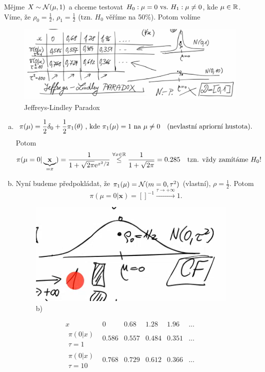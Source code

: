 \begin{example}
	Mějme $X\sim\mathcal{N}(\mu,1)$ a chceme testovat $H_0: \mu=0 ~\text{vs.}~ H_1: \mu\neq0$, kde $\mu\in\mathbb{R}$. Víme, že $\rho_0=\frac{1}{2}$, $\rho_1=\frac{1}{2}$ (tzn. $H_0$ věříme na 50\%). Potom volíme
	\begin{figure}[h]
		\centering
		\includegraphics[width=0.8\linewidth]{pictures/last02}
		\caption{Jeffreys-Lindley Paradox}
		\label{fig:last02}
	\end{figure}
	
	\begin{enumerate}[a)]
		\item $$ \pi(\mu)=\frac{1}{2}\delta_0+\frac{1}{2}\pi_1(\theta)\text{ , kde }\pi_1(\mu)=1\text{ na }\mu\neq0\quad(\text{nevlastní apriorní hustota}).$$
		Potom $$ \pi(\mu=0|\underbrace{\textbf{x}}_{=x})=\frac{1}{1+\sqrt{2\pi} \mathrm{e}^{x^2/2}}\stackrel{\forall x\in\mathbb{R}}{\leq}\frac{1}{1+\sqrt{2\pi}}=0.285\quad \text{tzn. vždy zamítáme }H_0!$$
		\item Nyní budeme předpokládat, že $\pi_1(\mu)=\mathcal{N}(m=0,\tau^2)$ (vlastní), $\rho=\frac{1}{2}$. Potom $$\pi(\mu=0|\textbf{x})=[]^{-1}\stackrel{\tau\to+\infty}{\longrightarrow}1.$$
		\begin{figure}[h]
			\centering
			\includegraphics[width=0.5\linewidth]{pictures/last01}
			\caption{b)}
			\label{fig:last01}
		\end{figure}
		
	\end{enumerate}
$$ \begin{array}{c|c|c|c|c|c}
x & 0 & 0.68 & 1.28 & 1.96 & ... \\\hline
\substack{\pi(0|x)\\ \tau=1}& 0.586 & 0.557 & 0.484 & 0.351 & ... \\\hline
\substack{\pi(0|x)\\ \tau=10}& 0.768 & 0.729 & 0.612 & 0.366 & ...
\end{array}
 $$
\end{example}